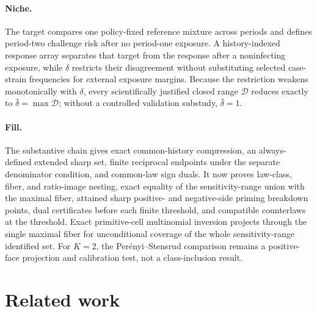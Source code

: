\documentclass{article}
\begin{document}
\paragraph{Niche.} The target compares one policy-fixed reference mixture across periods and defines period-two challenge risk after no period-one exposure. A history-indexed response array separates that target from the response after a noninfecting exposure, while \(\delta\) restricts their disagreement without substituting selected case-strain frequencies for external exposure margins. Because the restriction weakens monotonically with \(\delta\), every scientifically justified closed range \(\mathcal D\) reduces exactly to \(\bar\delta=\max\mathcal D\); without a controlled validation substudy, \(\bar\delta=1\).

\paragraph{Fill.} The substantive chain gives exact common-history compression, an always-defined extended sharp set, finite reciprocal endpoints under the separate denominator condition, and common-law sign duals. It now proves law-class, fiber, and ratio-image nesting, exact equality of the sensitivity-range union with the maximal fiber, attained sharp positive- and negative-side priming breakdown points, dual certificates before each finite threshold, and compatible counterlaws at the threshold. Exact primitive-cell multinomial inversion projects through the single maximal fiber for unconditional coverage of the whole sensitivity-range identified set. For \(K=2\), the Perényi--Stensrud comparison remains a positive-face projection and calibration test, not a class-inclusion result.

\section{Related work}
\end{document}
